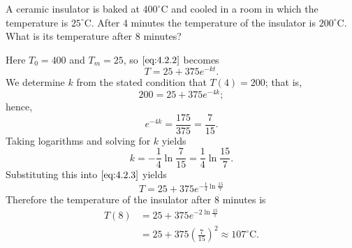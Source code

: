 \documentclass{ximera}
\begin{document}
 
\begin{example}\label{example:4.2.1}
A ceramic insulator is baked at $400^\circ$C and cooled in a room in
which the temperature is $25^\circ$C. After 4 minutes the
temperature of the insulator is $200^\circ$C. What is its temperature
after 8 minutes?
\begin{explanation} Here $T_0=400$ and $T_m=25$, so $\eqref{eq:4.2.2}$ becomes
\begin{equation} \label{eq:4.2.3}
T=25+375e^{-kt}.
\end{equation}
 We determine $k$ from the stated condition that  $T(4)=200$;
that is,
$$
200=25+375e^{-4k};
$$
 hence,
$$
e^{-4k} = \frac{175}{375} = \frac{7}{15}.
$$
 Taking logarithms and solving for $k$ yields
$$
k=-\frac{1}{4} \ln \frac{7}{15}=\frac{1}{4}\ln \frac{15}{7}.
$$
 Substituting this into $\eqref{eq:4.2.3}$ yields
$$
T=25+375 e^{-\frac{t}{4} \ln \frac{15}{7}}
$$
Therefore the temperature of the insulator after
8 minutes is
$$\begin{array}{rl}
T(8) & = 25+375 e^{-2 \ln \frac{15}{7}} \\
& = 25+375 \left(\frac{7}{15}\right)^2 \approx
107^\circ \mbox{C}.
\end{array}$$

\begin{center}
\end{center}

  
\end{explanation}
\end{example}
 
\end{document}
